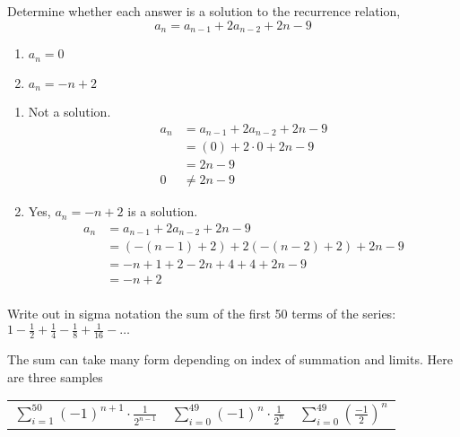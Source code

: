 \documentclass[12pt,addpoints]{exam}
\newcommand{\ds}{\displaystyle}
\begin{document}
\begin{questions}
\question[6] Determine whether each answer is a solution to the recurrence relation, 
$$ a_n = a_{n-1} + 2a_{n-2} + 2n - 9 $$
	\begin{enumerate}[label=(\alph*),topsep=0pt,itemsep=0pt,parsep=0pt]
		\item $a_n = 0$
		\item $a_n = -n +2$
	\end{enumerate}
    \ifprintanswers
        \vspace{-10pt}
   	\fi
\begin{solution}
	\begin{enumerate}[label=(\alph*),topsep=0pt,itemsep=0pt,parsep=0pt]
		\item Not a solution.
		\begin{align*}
			a_n &= a_{n-1} + 2a_{n-2} + 2n - 9 \\
			&= (0) + 2\cdot0 + 2n - 9 \\
			&= 2n - 9 \\
			0 &\neq 2n - 9
		\end{align*}
		\item Yes, $a_n = -n + 2$ is a solution.
		\begin{align*}
			a_n &= a_{n-1} + 2a_{n-2} + 2n - 9 \\
			&= (-(n-1) + 2) + 2(-(n-2) + 2) + 2n -9 \\
			&= -n + 1 + 2 -2n + 4 + 4 + 2n -9 \\
			&= -n +2 \\
		\end{align*}
	\end{enumerate}
\end{solution}
		

\question[3] Write out in sigma notation the sum of the first 50 terms of the series: $1 - \frac{1}{2} + \frac{1}{4} - \frac{1}{8} + \frac{1}{16} - \ldots$
    \ifprintanswers
        \vspace{-10pt}
   \fi
\begin{solution}
    The sum can take many form depending on index of summation and limits.  Here are three samples
    
    \begin{center}
    \begin{tabular}{ccc}
		$\ds \sum_{i=1}^{50} (-1)^{n+1}\cdot\frac{1}{2^{n-1}}$ \hspace{0.25in}
		& $\ds \sum_{i=0}^{49} (-1)^{n}\cdot\frac{1}{2^{n}}$ \hspace{0.2in}
		& $\ds \sum_{i=0}^{49} \left(\frac{-1}{2}\right)^n$
	\end{tabular}
	\end{center}
\end{solution}




\end{questions}
\end{document}
